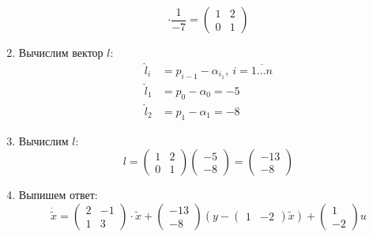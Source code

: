 \documentclass[../../TAU.tex]{subfiles}
\begin{document}
\begin{enumerate}
$$                \cdot
                \frac{1}{-7}=
                \begin{pmatrix}
                    1 & 2\\
                    0 & 1
                \end{pmatrix}
            $$
        \item Вычислим вектор $l$:
            \begin{align*}
                \widehat l_i &= p_{i-1} - \alpha_{i_1},\ i=\overline{1\dots n} \\
                \widehat l_1 &= p_{0} - \alpha_{0} = -5 \\
                \widehat l_2 &= p_{1} - \alpha_{1} = -8
            \end{align*}
        \item Вычислим $l$:
        $$
            l =
            \begin{pmatrix}
                1 & 2\\
                0 & 1
            \end{pmatrix}
            \begin{pmatrix}
                -5 \\
                -8
            \end{pmatrix}
            =
            \begin{pmatrix}
                -13 \\
                -8
            \end{pmatrix}
        $$
        \item Выпишем ответ:
        $$
            \dot{\widetilde x} =
            \begin{pmatrix}
                2 & -1 \\
                1 & 3
            \end{pmatrix}
            \cdot \widetilde x
            +
            \begin{pmatrix}
                -13 \\
                -8
            \end{pmatrix}
            \left(y-\begin{pmatrix}1 & -2\end{pmatrix}\widetilde x\right)
            +
            \begin{pmatrix}
                1 \\ -2
            \end{pmatrix}
            u
        $$
    \end{enumerate}
\end{document}

